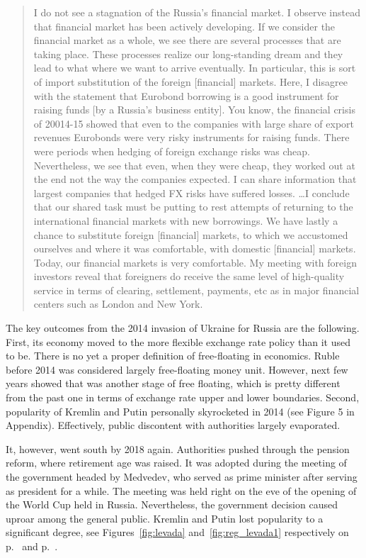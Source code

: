 \begin{quote}
 I do not see a stagnation of the Russia's financial market. I observe
 instead that financial market has been actively developing. If we
 consider the financial market as a whole, we see there are several
 processes that are taking place. These processes realize our
 long-standing dream and they lead to what where we want to arrive
 eventually. In particular, this is sort of import substitution of the
 foreign [financial] markets. Here, I disagree with the statement that
 Eurobond borrowing is a good instrument for raising funds [by a
 Russia's business entity]. You know, the financial crisis of 20014-15
 showed that even to the companies with large share of export revenues
 Eurobonds were very risky instruments for raising funds. There were
 periods when hedging of foreign exchange risks was cheap.
 Nevertheless, we see that even, when they were cheap, they worked out
 at the end not the way the companies expected. I can share information
 that largest companies that hedged FX risks have suffered losses.
 \dots I conclude that our shared task must be putting to rest attempts
 of returning to the international financial markets with new
 borrowings. We have lastly a chance to substitute foreign [financial]
 markets, to which we accustomed ourselves and where it was
 comfortable, with domestic [financial] markets. Today, our financial
 markets is very comfortable. My meeting with foreign investors reveal
 that foreigners do receive the same level of high-quality service in
 terms of clearing, settlement, payments, etc as in major financial
 centers such as London and New York.~\citep{moiseev}
\end{quote}

The key outcomes from the 2014 invasion of Ukraine for Russia are the
following. First, its economy moved to the more flexible exchange rate
policy than it used to be. There is no yet a proper definition of
free-floating in economics. Ruble before 2014 was considered largely
free-floating money unit. However, next few years showed that was
another stage of free floating, which is pretty different from the past
one in terms of exchange rate upper and lower boundaries. Second,
popularity of Kremlin and Putin personally skyrocketed in 2014 (see
Figure 5 in Appendix). Effectively, public discontent with authorities
largely evaporated.

It, however, went south by 2018 again. Authorities pushed through the
pension reform, where retirement age was raised. It was adopted during
the meeting of the government headed by Medvedev, who served as prime
minister after serving as president for a while. The meeting was held
right on the eve of the opening of the World Cup held in Russia.
Nevertheless, the government decision caused uproar among the general
public. Kremlin and Putin lost popularity to a significant degree, see Figures~\ref{fig:levada} and~\ref{fig:reg_levada1} respectively on p.~\pageref{fig:levada} and p.~\pageref{fig:reg_levada1}.

